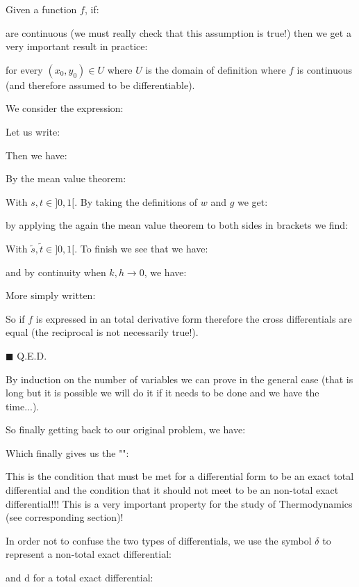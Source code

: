 	\begin{theorem}
	Given a function $f$, if:
	
	are continuous (we must really check that this assumption is true!) then we get a very important result in practice:
	
	for every $(x_0,y_0)\in U$ where $U$ is the domain of definition where $f$ is continuous (and therefore assumed to be differentiable).
	\end{theorem}
	\begin{dem}
	We consider the expression:
	
	Let us write:
	
	Then we have:
	
	By the mean value theorem:
	
	With $s,t \in ]0,1[$. By taking the definitions of $w$ and $g$ we get:
	
	by applying the again the mean value theorem to both sides in brackets we find:
	
	With $\tilde{s},\tilde{t} \in ]0,1[$. To finish we see that we have:
	
	and by continuity when $k,h\rightarrow 0$, we have:
	
	More simply written:
	
	So if $f$ is expressed in an total derivative  form therefore the cross differentials are equal (the reciprocal is not necessarily true!).
	\begin{flushright}
		$\blacksquare$  Q.E.D.
	\end{flushright}
	\end{dem}
	By induction on the number of variables we can prove in the general case (that is long but it is possible we will do it if it needs to be done and we have the time...).
	
	So finally getting back to our original problem, we have:
	
	Which finally gives us the "":
	
	This is the condition that must be met for a differential form to be an exact total differential and the condition that it should not meet to be an non-total exact differential!!! This is a very important property for the study of Thermodynamics (see corresponding section)!
	
	In order not to confuse the two types of differentials, we use the symbol $\delta$ to represent a non-total exact differential:
	
	and $\mathrm{d}$ for a total exact differential:
	
